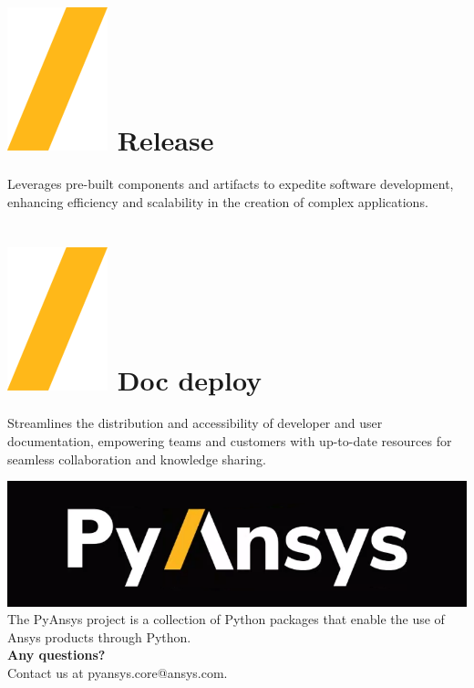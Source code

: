 \documentclass[a0paper,fleqn]{src/betterposter}
\begin{document}
{\section{\includegraphics[height=\fontcharht\font`\S]{img/general/slash.png} Release}
Leverages pre-built components and artifacts to expedite software development,
enhancing efficiency and scalability in the creation of complex applications.

\section{\includegraphics[height=\fontcharht\font`\S]{img/general/slash.png} Doc deploy}
Streamlines the distribution and accessibility of developer and user
documentation, empowering teams and customers with up-to-date resources for
seamless collaboration and knowledge sharing.

\vfill

\includegraphics[width=\textwidth]{img/general/pyansys_dark}\\
The PyAnsys project is a collection of Python packages that enable the use of Ansys products through Python.
\\
\newline
\textbf{Any questions?} \\Contact us at pyansys.core@ansys.com.
\\
\newline

}
\end{document}
